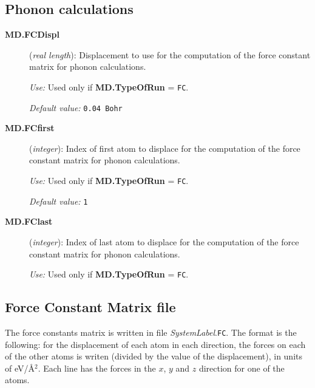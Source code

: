 \documentclass[11pt]{article}
\begin{document}
\subsection{Phonon calculations}
\begin{description}
\item[{\bf MD.FCDispl}] ({\it real length}): 
Displacement to use for the computation of the force constant
matrix for phonon calculations.

{\it Use:} Used only if {\bf MD.TypeOfRun} = {\tt FC}.

{\it Default value:}  {\tt 0.04 Bohr}

\item[{\bf MD.FCfirst}] ({\it integer}): 
Index of first atom to displace for the computation of the force constant
matrix for phonon calculations.

{\it Use:} Used only if {\bf MD.TypeOfRun} = {\tt FC}.

{\it Default value:}  {\tt 1}

\item[{\bf MD.FClast}] ({\it integer}): 
Index of last atom to displace for the computation of the force constant
matrix for phonon calculations.

{\it Use:} Used only if {\bf MD.TypeOfRun} = {\tt FC}.
\end{description}

\subsection{Force Constant Matrix file}

The force constants matrix is written in file {\it SystemLabel}.{\tt FC}.
The format is the following: for the displacement of
each atom in each direction, the forces on each of the other
atoms is writen (divided by the value of the displacement),
in units of eV/\AA$^2$. Each line has the forces in the $x$, $y$
and $z$ direction for one of the atoms.
\end{document}

